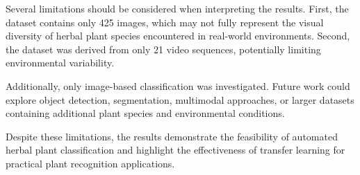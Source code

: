 Several limitations should be considered when interpreting the results. First, the dataset contains only 425 images, which may not fully represent the visual diversity of herbal plant species encountered in real-world environments. Second, the dataset was derived from only 21 video sequences, potentially limiting environmental variability.

Additionally, only image-based classification was investigated. Future work could explore object detection, segmentation, multimodal approaches, or larger datasets containing additional plant species and environmental conditions.

Despite these limitations, the results demonstrate the feasibility of automated herbal plant classification and highlight the effectiveness of transfer learning for practical plant recognition applications.
